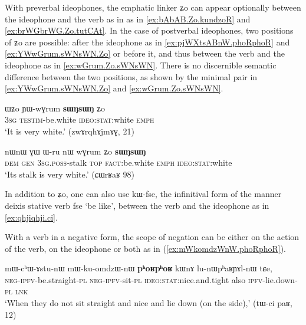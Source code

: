 \documentclass[oldfontcommands,oneside,a4paper,11pt]{article}
\newcommand{\ipa}[1]{{\phon \mbox{#1}}} %
\begin{document}
With preverbal ideophones, the emphatic linker \ipa{ʑo} can appear optionally between the ideophone and the verb as in as in \ref{ex:bAbAB.Zo.kundzoR} and \ref{ex:brWGbrWG.Zo.tutCAt}. In the case of postverbal ideophones, two positions of \ipa{ʑo} are possible: after the ideophone as in \ref{ex:pjWXtsABnW.phoRphoR} and \ref{ex:YWwGrum.sWNsWN.Zo} or before it, and thus between the verb and the ideophone as in \ref{ex:wGrum.Zo.sWNsWN}. There is no discernible semantic difference between the two positions, as shown by the minimal pair in \ref{ex:YWwGrum.sWNsWN.Zo} and \ref{ex:wGrum.Zo.sWNsWN}.

  \begin{exe}
\ex \label{ex:YWwGrum.sWNsWN.Zo}
\gll 
 \ipa{ɯʑo}  	\ipa{ɲɯ-wɣrum}  	\ipa{\textbf{sɯŋsɯŋ}}  	\ipa{ʑo}  \\
\textsc{3sg} \textsc{testim}-be.white \textsc{ideo:stat}:white  \textsc{emph} \\
\glt `It is very white.' (zwɤrqhɤjmɤɣ, 21)
\end{exe}
 \begin{exe}
\ex \label{ex:wGrum.Zo.sWNsWN}
\gll 
\ipa{nɯnɯ}  	\ipa{ɣɯ}  	\ipa{ɯ-ru}  	\ipa{nɯ}  	\ipa{wɣrum}  	\ipa{ʑo}  	\ipa{\textbf{sɯŋsɯŋ}}  \\
\textsc{dem} \textsc{gen} \textsc{3sg.poss}-stalk \textsc{top} \textsc{fact}:be.white \textsc{emph} \textsc{ideo:stat}:white \\
\glt `Its stalk is very white.' (ɕɯrʁaʁ 98)
\end{exe}

In addition to \ipa{ʑo}, one can also use \ipa{kɯ-fse}, the infinitival  form  of the manner deixis stative verb \ipa{fse} `be like', between the verb and the ideophone as in \ref{ex:qhjiqhji.ci}.



With a verb in a negative form, the scope of  negation can be either on the action of the verb, on the ideophone or both as in (\ref{ex:mWkomdzWnW.phoRphoR}).

 \begin{exe}
\ex \label{ex:mWkomdzWnW.phoRphoR}
\gll 
 \ipa{mɯ-cʰɯ-ɤstu-nɯ} 	\ipa{mɯ-ku-omdzɯ-nɯ} 	\ipa{\textbf{pʰoʁpʰoʁ}} 	\ipa{kɯnɤ} 	\ipa{lu-nɯpʰaʁɲɤl-nɯ} 	\ipa{tɕe,} \\
\textsc{neg-ipfv}-be.straight-\textsc{pl} \textsc{neg-ipfv}-sit-\textsc{pl} \textsc{ideo:stat}:nice.and.tight
also \textsc{ipfv}-lie.down-\textsc{pl} \textsc{lnk} \\
\glt `When they do not sit straight and nice and   lie down (on the side),' (tɯ-ci paʁ, 12)
\end{exe}
\end{document}
